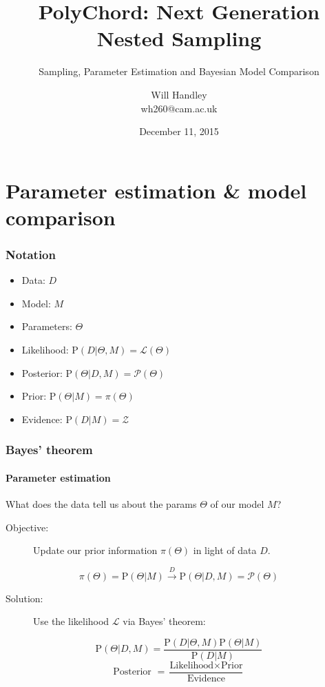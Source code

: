 \documentclass[]{beamer}
\title{PolyChord: Next Generation Nested Sampling}
\subtitle{Sampling, Parameter Estimation and Bayesian Model Comparison}
\author[Handley] %
{Will Handley\\ \small{wh260@cam.ac.uk}}
\institute[University of Cambridge] %
{%
Supervisors: Anthony Lasenby \& Mike Hobson \\
Astrophysics Department \\
Cavendish Laboratory\\
University of Cambridge
}
\date{December 11, 2015}
\newcommand{\lik}{\mathcal{L}}
\newcommand{\posterior}{\mathcal{P}}
\newcommand{\prior}{\pi}
\newcommand{\ev}{\mathcal{Z}}
\newcommand{\prob}{\mathrm{P}}
\begin{document}
\begin{frame}
  \titlepage
\end{frame}

\begin{frame}
  \tableofcontents
\end{frame}



\section{Parameter estimation \& model comparison}
\begin{frame}
  \frametitle{Notation} 

  \begin{itemize}
      \pause
    \item Data: $D$
      \pause
    \item Model: $M$
      \pause
    \item Parameters: $\Theta$
      \pause
    \item Likelihood: $\prob(D|\Theta,M)=\lik(\Theta)$
      \pause
    \item Posterior: $\prob(\Theta|D,M)=\posterior(\Theta)$
      \pause
    \item Prior: $\prob(\Theta|M)=\prior(\Theta)$
      \pause
    \item Evidence: $\prob(D|M)=\ev$
  \end{itemize}


\end{frame}

\begin{frame}
  \frametitle{Bayes' theorem}
  \framesubtitle{Parameter estimation}

  \pause
  What does the data tell us about the params $\Theta$ of our model $M$?

  \pause
  \begin{description}
  \item[Objective:] Update our prior information $\prior(\Theta)$ in light of data $D$.
  \end{description}

  \pause
    \[\prior(\Theta) = \prob(\Theta|M) \xrightarrow{D} \prob(\Theta|D,M) = \posterior(\Theta)\] 

    \pause
  \begin{description}
    \item[Solution:] Use the likelihood $\lik$ via Bayes' theorem:
  \end{description}

  \pause
    \[\prob(\Theta|D,M) = \frac{\prob(D|\Theta,M) \prob(\Theta|M) }{ \prob(D|M) }\] 
    \pause
    \[\text{Posterior } = \frac{\text{Likelihood} \times \text{Prior} } {\text{Evidence} }\] 

\end{frame}
\end{document}
